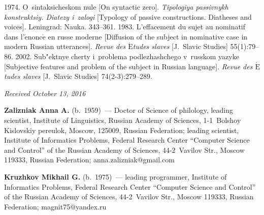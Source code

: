 \begin{multicols}{2}
{{\begin{thebibliography}{99}
 1974. O~sintaksicheskom nule [On syntactic zero]. \textit{Tipologiya 
passivnykh konstruktsiy. Diatezy i~zalogi} [Typology of passive constructions. Diatheses and 
voices]. Leningrad: Nauka. 343--361.
 1983. L'effacement du sujet au nominatif dans 
l'$\acute{\mbox{e}}$nonc$\acute{\mbox{e}}$ en russe moderne [Diffusion of the subject in 
nominative case in modern Russian utterances]. \textit{Revue des $\acute{\mbox{E}}$tudes 
slaves} [J.~Slavic Studies] 55(1):79--86.
 2002. Sub"ektnye cherty i~problema podlezhashchego v~russkom 
yazyke [Subjective features and problem of the subject in Russian language]. \textit{Revue des 
$\acute{\mbox{E}}$tudes slaves} [J.~Slavic Studies] 74(2-3):279--289.
\end{thebibliography}

 }
 }

\end{multicols}

\vspace*{-3pt}

\hfill{\small\textit{Received October 13, 2016}}

\Contr

\noindent
\textbf{Zalizniak Anna A.} (b.\ 1959)~---  Doctor of Science of philology, leading scientist, 
Institute of Linguistics, Russian Academy of Sciences, 1-1~Bolshoy Kislovskiy pereulok, Moscow, 
125009, Russian Federation; leading scientist, Institute of Informatics Problems, Federal Research 
Center ``Computer Science and Control'' of the Russian Academy of Sciences, 44-2~Vavilov Str., 
Moscow 119333, Russian Federation; \mbox{anna.zalizniak@gmail.com}

\vspace*{3pt}

\noindent
\textbf{Kruzhkov Mikhail G.} (b.\ 1975)~--- leading programmer, Institute of Informatics 
Problems, Federal Research Center ``Computer Science and Control'' of the Russian Academy of 
Sciences, 44-2~Vavilov Str., Moscow 119333, Russian Federation; \mbox{magnit75@yandex.ru}
\label{end\stat}


\renewcommand{\bibname}{\protect\rm Литература} 